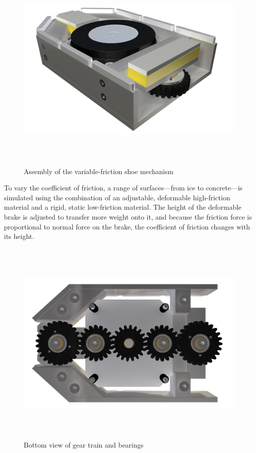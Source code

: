 \documentclass[12pt, landscape]{article}
\begin{document}
		\begin{figure}[H]
			\centering
			\includegraphics[height=4in]{media/isometric_front}
			\caption{Assembly of the variable-friction shoe mechanism}
			\label{overview}
		\end{figure}

		To vary the coefficient of friction, a range of surfaces---from ice to concrete---is simulated using the combination of an adjustable, deformable high-friction material and a rigid, static low-friction material.  The height of the deformable brake is adjusted to transfer more weight onto it, and because the friction force is proportional to normal force on the brake, the coefficient of friction changes with its height.

		\begin{figure}[H]
			\centering
			\includegraphics[height=4in]{media/bottom_gears}
			\caption{Bottom view of gear train and bearings}
			\label{bottom}
		\end{figure}
\end{document}
